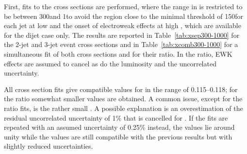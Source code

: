 First, fits to the cross sections are performed, where the range in
\httwo is restricted to be between 300\GeV and 1\TeV to avoid the
region close to the minimal \pt threshold of 150\GeV for each jet at
low \pt and the onset of electroweak effects at high \pt, which are
available for the dijet case only. The results are reported in
Table~\ref{tab:xsep300-1000} for the 2-jet and 3-jet event cross
sections and in Table~\ref{tab:xcomb300-1000} for a simultaneous fit
of both cross sections and for their ratio. In the ratio, EWK effects
are assumed to cancel as do the luminosity and the uncorrelated
uncertainty.

All cross section fits give compatible values for \alpsmz in the range
of 0.115--0.118; for the ratio \ratio somewhat smaller values are
obtained.  A common issue, except for the ratio fits, is the rather
small \chisqndof. A possible explanation is an overestimation of the
residual uncorrelated uncertainty of 1\% that is cancelled for \ratio.
If the fits are repeated with an assumed uncertainty of 0.25\%
instead, the \chisqndof values lie around unity while the \alpsmz
values are still compatible with the previous results but with
slightly reduced uncertainties.

